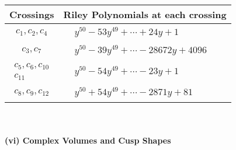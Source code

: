 \documentclass[1p]{elsarticle_modified}
\theoremstyle{definition}
\begin{document}
\begin{tabular}{m{50pt}|m{274pt}}
Crossings & \hspace{64pt}Riley Polynomials at each crossing \\
\hline $$\begin{aligned}c_{1},c_{2},c_{4}\end{aligned}$$&$\begin{aligned}
&y^{50}-53 y^{49}+\cdots+24 y+1
\end{aligned}$\\
\hline $$\begin{aligned}c_{3},c_{7}\end{aligned}$$&$\begin{aligned}
&y^{50}-39 y^{49}+\cdots-28672 y+4096
\end{aligned}$\\
\hline $$\begin{aligned}c_{5},c_{6},c_{10}\\c_{11}\end{aligned}$$&$\begin{aligned}
&y^{50}-54 y^{49}+\cdots-23 y+1
\end{aligned}$\\
\hline $$\begin{aligned}c_{8},c_{9},c_{12}\end{aligned}$$&$\begin{aligned}
&y^{50}+54 y^{49}+\cdots-2871 y+81
\end{aligned}$\\
\hline
\end{tabular}\\~\\
\newpage\flushleft \textbf{(vi) Complex Volumes and Cusp Shapes}
\end{document}
